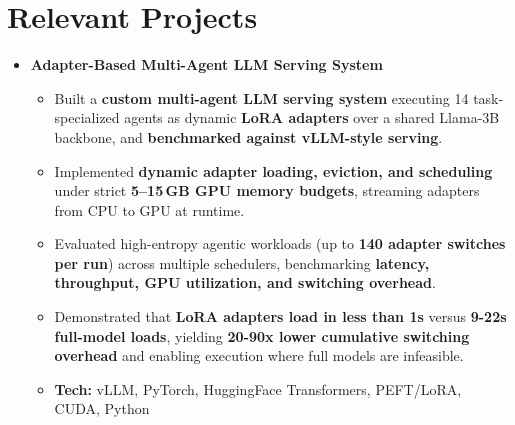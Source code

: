 \documentclass[a4paper,11pt]{article}
\begin{document}
\color{BlueViolet}
\section{Relevant Projects}
\color{black}

\begin{itemize}
  \item \textbf{Adapter-Based Multi-Agent LLM Serving System}
    \begin{itemize}[nosep, after=\strut, leftmargin=1.2em, itemsep=2pt]
      \item Built a \textbf{custom multi-agent LLM serving system} executing 14 task-specialized agents as dynamic \textbf{LoRA adapters} over a shared Llama-3B backbone, and \textbf{benchmarked against vLLM-style serving}.

      \item Implemented \textbf{dynamic adapter loading, eviction, and scheduling} under strict \textbf{5--15\,GB GPU memory budgets}, streaming adapters from CPU to GPU at runtime.
      \item Evaluated high-entropy agentic workloads (up to \textbf{140 adapter switches per run}) across multiple schedulers, benchmarking \textbf{latency, throughput, GPU utilization, and switching overhead}.
      \item Demonstrated that \textbf{LoRA adapters load in less than 1s} versus \textbf{9-22s full-model loads}, yielding \textbf{20-90x lower cumulative switching overhead} and enabling execution where full models are infeasible.
      \item \textbf{Tech:} vLLM, PyTorch, HuggingFace Transformers, PEFT/LoRA, CUDA, Python
    \end{itemize}


\end{itemize}
\end{document}
